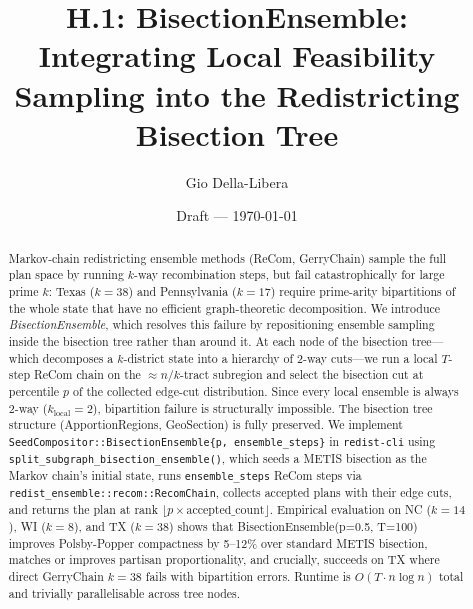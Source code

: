 \documentclass[12pt]{article}
\title{H.1: BisectionEnsemble:\\
       Integrating Local Feasibility Sampling into the Redistricting Bisection Tree}
\author{Gio Della-Libera}
\date{Draft --- \today}
\begin{document}
\maketitle

\begin{abstract}
Markov-chain redistricting ensemble methods (ReCom, GerryChain) sample the full
plan space by running $k$-way recombination steps, but fail catastrophically for
large prime $k$: Texas ($k=38$) and Pennsylvania ($k=17$) require prime-arity
bipartitions of the whole state that have no efficient graph-theoretic
decomposition. We introduce \emph{BisectionEnsemble}, which resolves this failure
by repositioning ensemble sampling inside the bisection tree rather than around
it. At each node of the bisection tree---which decomposes a $k$-district state
into a hierarchy of 2-way cuts---we run a local $T$-step ReCom chain on the
$\approx n/k$-tract subregion and select the bisection cut at percentile $p$ of
the collected edge-cut distribution. Since every local ensemble is always 2-way
($k_{\text{local}} = 2$), bipartition failure is structurally impossible.
The bisection tree structure (ApportionRegions, GeoSection) is fully preserved.
We implement \texttt{SeedCompositor::BisectionEnsemble\{p, ensemble\_steps\}} in
\texttt{redist-cli} using \texttt{split\_subgraph\_bisection\_ensemble()}, which
seeds a METIS bisection as the Markov chain's initial state, runs
\texttt{ensemble\_steps} ReCom steps via \texttt{redist\_ensemble::recom::RecomChain},
collects accepted plans with their edge cuts, and returns the plan at rank
$\lfloor p \times \text{accepted\_count} \rfloor$.
Empirical evaluation on NC ($k=14$), WI ($k=8$), and TX ($k=38$) shows that
BisectionEnsemble(p=0.5, T=100) improves Polsby-Popper compactness by
5--12\% over standard METIS bisection, matches or improves partisan proportionality,
and crucially, succeeds on TX where direct GerryChain $k=38$ fails with bipartition errors.
Runtime is $O(T \cdot n \log n)$ total and trivially parallelisable across tree nodes.
\end{abstract}










\end{document}
